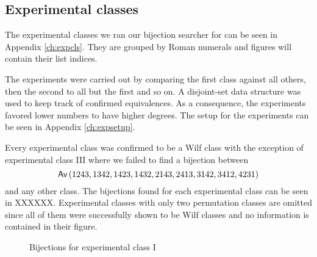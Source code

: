 \subsection{Experimental classes}
The experimental classes we ran our bijection searcher for can be seen in Appendix \ref{ch:expcls}. They are grouped by Roman numerals and figures will contain their list indices.

The experiments were carried out by comparing the first class against all others, then the second to all but the first and so on. A disjoint-set data structure was used to keep track of confirmed equivalences. As a consequence, the experiments favored lower numbers to have higher degrees. The setup for the experiments can be seen in Appendix \ref{ch:expsetup}.

Every experimental class was confirmed to be a Wilf class with the exception of experimental class III where we failed to find a bijection between
\[
    \textsf{Av}\left(1243,1342,1423,1432,2143,2413,3142,3412,4231\right)
\]
and any other class. The bijections found for each experimental class can be seen in XXXXXX. Experimental classes with only two permutation classes are omitted since all of them were successfully shown to be Wilf classes and no information is contained in their figure.


\begin{figure}[ht!]
\centering
{}
\caption{Bijections for experimental class I}
\label{fig:expgrp_I}
\end{figure}


